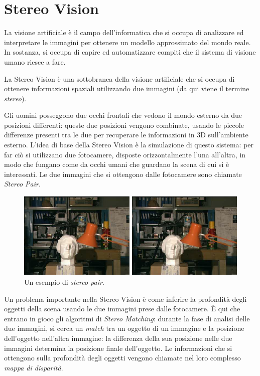 \documentclass[12pt,a4paper,openright,twoside]{report}
\begin{document}
\chapter{Stereo Vision}

La visione artificiale è il campo dell'informatica che si occupa di analizzare ed interpretare le immagini per ottenere un modello approssimato del mondo reale. In sostanza, si occupa di capire ed automatizzare compiti che il sistema di visione umano riesce a fare.

La Stereo Vision è una sottobranca della visione artificiale che si occupa di ottenere informazioni spaziali utilizzando due immagini (da qui viene il termine \textit{stereo}).

Gli uomini posseggono due occhi frontali che vedono il mondo esterno da due posizioni differenti: queste due posizioni vengono combinate, usando le piccole differenze presenti tra le due per recuperare le informazioni in 3D sull'ambiente esterno. L'idea di base della Stereo Vision è la simulazione di questo sistema: per far ciò si utilizzano due fotocamere, disposte orizzontalmente l'una all'altra, in modo che fungano come da occhi umani che guardano la scena di cui si è interessati. Le due immagini che si ottengono dalle fotocamere sono chiamate \textit{Stereo Pair}.

\begin{figure}[h]
    \centering
    \includegraphics[width=\textwidth]{tsukuba-stereo-pair.png}
    \caption{Un esempio di \textit{stereo pair}.}
    \label{img:stereo_pair}
\end{figure}

Un problema importante nella Stereo Vision è come inferire la profondità degli oggetti della scena usando le due immagini prese dalle fotocamere. È qui che entrano in gioco gli algoritmi di \textit{Stereo Matching}: durante la fase di analisi delle due immagini, si cerca un \textit{match} tra un oggetto di un immagine e la posizione dell'oggetto nell'altra immagine: la differenza della sua posizione nelle due immagini determina la posizione finale dell'oggetto. Le informazioni che si ottengono sulla profondità degli oggetti vengono chiamate nel loro complesso \textit{mappa di disparità}.
\end{document}

